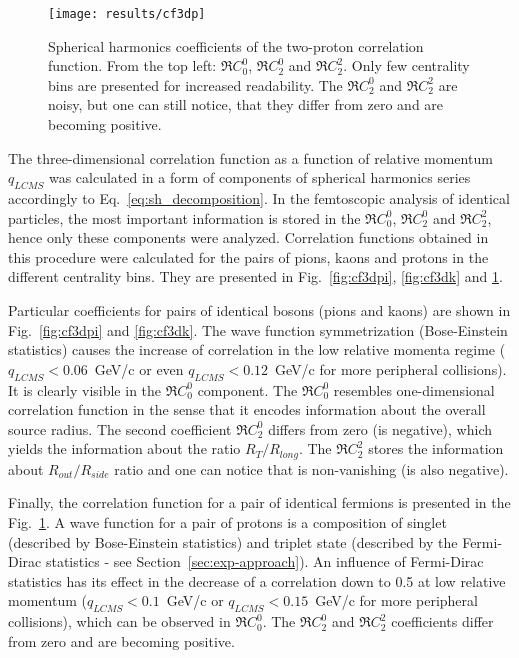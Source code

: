       \begin{figure}[b]
        \centering
        \centerline{\texttt{[image: results/cf3dp]}}
        \caption{Spherical harmonics coefficients of the two-proton correlation function. From the top left: $\Re C^0_0$, $\Re C^0_2$ and $\Re C^2_2$. Only few centrality bins are presented for increased readability. The $\Re C^0_2$ and $\Re C^2_2$ are noisy, but one can still notice, that they differ from zero and are becoming positive.}
      \label{fig:cf3dp}
      \end{figure}

      The three-dimensional correlation function as a function of relative momentum $q_{LCMS}$ was calculated in a form of components of spherical harmonics series accordingly to Eq.~\ref{eq:sh_decomposition}.
      In the femtoscopic analysis of identical particles, the most important information is stored in the $\Re C^0_0$, $\Re C^0_2$ and $\Re C^2_2$, hence only these components were analyzed.
      Correlation functions obtained in this procedure were calculated for the pairs of pions, kaons and protons in the different centrality bins.
      They are presented in Fig.~\ref{fig:cf3dpi}, \ref{fig:cf3dk} and \ref{fig:cf3dp}.
      
      Particular coefficients for pairs of identical bosons (pions and kaons) are shown in Fig.~\ref{fig:cf3dpi} and \ref{fig:cf3dk}.
      The wave function symmetrization (Bose-Einstein statistics) causes the increase of correlation in the low relative momenta regime (\mbox{$q_{LCMS}<0.06$~GeV/c} or even \mbox{$q_{LCMS}<0.12$~GeV/c} for more peripheral collisions).
      It is clearly visible in the $\Re C^0_0$ component.
      The $\Re C_0^0$ resembles one-dimensional correlation function in the sense that it encodes information about the overall source radius.
      The second coefficient $\Re C^0_2$ differs from zero (is negative), which yields the information about the ratio $R_T / R_{long}$.
      The $\Re C^2_2$ stores the information about $R_{out} / R_{side}$ ratio and one can notice that is non-vanishing (is also negative).

      Finally, the correlation function for a pair of identical fermions is presented in the Fig.~\ref{fig:cf3dp}.
      A wave function for a pair of protons is a composition of singlet (described by Bose-Einstein statistics) and triplet state (described by the Fermi-Dirac statistics - see Section~\ref{sec:exp-approach}).
      An influence of Fermi-Dirac statistics has its effect in the decrease of a correlation down to 0.5 at low relative momentum (\mbox{$q_{LCMS}<0.1$~GeV/c} or \mbox{$q_{LCMS}<0.15$~GeV/c} for more peripheral collisions), which can be observed in $\Re C^0_0$.
      The $\Re C^0_2$ and $\Re C^2_2$ coefficients differ from zero and are becoming positive.

